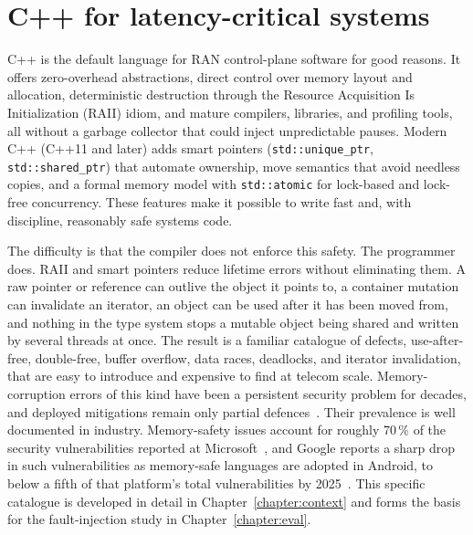 \documentclass[english,oneside,a4paper,censored,csm,software-track-2020]{HYthesisML}
\begin{document}
\section{C++ for latency-critical systems}\label{sec:cpplatency}
C++ is the default language for RAN control-plane software for good reasons. It offers
zero-overhead abstractions, direct control over memory layout and allocation, deterministic
destruction through the Resource Acquisition Is Initialization (RAII) idiom, and mature
compilers, libraries, and profiling tools, all without a garbage collector that could inject
unpredictable pauses. Modern C++ (C++11 and later) adds smart pointers
(\texttt{std::unique\_ptr}, \texttt{std::shared\_ptr}) that automate ownership, move semantics
that avoid needless copies, and a formal memory model with \texttt{std::atomic} for
lock-based and lock-free concurrency. These features make it possible to write fast and, with
discipline, reasonably safe systems code.

The difficulty is that the compiler does not enforce this safety. The programmer does. RAII and
smart pointers reduce lifetime errors without eliminating them. A raw pointer or reference can
outlive the object it points to, a container mutation can invalidate an iterator, an object can
be used after it has been moved from, and nothing in the type system stops a mutable object
being shared and written by several threads at once. The result is a familiar catalogue of
defects, use-after-free, double-free, buffer overflow, data races, deadlocks, and iterator
invalidation, that are easy to introduce and expensive to find at telecom scale. Memory-corruption errors of this kind have
been a persistent security problem for decades, and deployed mitigations remain only partial
defences~\cite{szekeres2013sok}. Their prevalence is well documented in
industry. Memory-safety issues account for roughly 70\,\% of the security vulnerabilities
reported at Microsoft~\cite{msrc2019memory}, and Google reports a sharp drop in such
vulnerabilities as memory-safe languages are adopted in Android, to below a fifth of that
platform's total vulnerabilities by
2025~\cite{google2022android,vanderstoep2025android}. This
specific catalogue is developed in detail in Chapter~\ref{chapter:context} and forms the basis
for the fault-injection study in Chapter~\ref{chapter:eval}.
\end{document}
